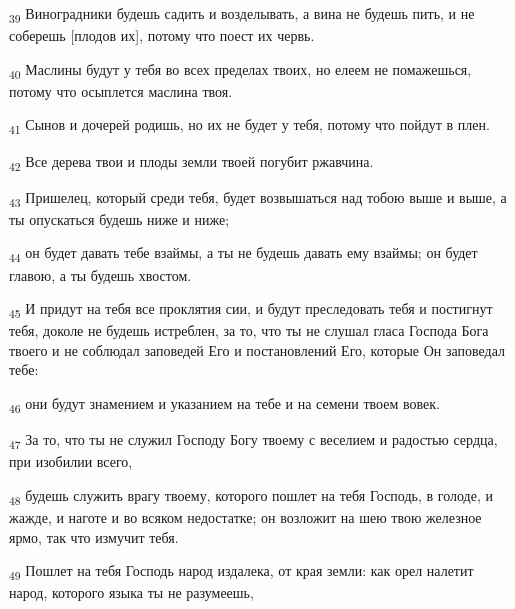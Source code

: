 \begin{tcolorbox}
\textsubscript{39} Виноградники будешь садить и возделывать, а вина не будешь пить, и не соберешь [плодов их], потому что поест их червь.
\end{tcolorbox}
\begin{tcolorbox}
\textsubscript{40} Маслины будут у тебя во всех пределах твоих, но елеем не помажешься, потому что осыплется маслина твоя.
\end{tcolorbox}
\begin{tcolorbox}
\textsubscript{41} Сынов и дочерей родишь, но их не будет у тебя, потому что пойдут в плен.
\end{tcolorbox}
\begin{tcolorbox}
\textsubscript{42} Все дерева твои и плоды земли твоей погубит ржавчина.
\end{tcolorbox}
\begin{tcolorbox}
\textsubscript{43} Пришелец, который среди тебя, будет возвышаться над тобою выше и выше, а ты опускаться будешь ниже и ниже;
\end{tcolorbox}
\begin{tcolorbox}
\textsubscript{44} он будет давать тебе взаймы, а ты не будешь давать ему взаймы; он будет главою, а ты будешь хвостом.
\end{tcolorbox}
\begin{tcolorbox}
\textsubscript{45} И придут на тебя все проклятия сии, и будут преследовать тебя и постигнут тебя, доколе не будешь истреблен, за то, что ты не слушал гласа Господа Бога твоего и не соблюдал заповедей Его и постановлений Его, которые Он заповедал тебе:
\end{tcolorbox}
\begin{tcolorbox}
\textsubscript{46} они будут знамением и указанием на тебе и на семени твоем вовек.
\end{tcolorbox}
\begin{tcolorbox}
\textsubscript{47} За то, что ты не служил Господу Богу твоему с веселием и радостью сердца, при изобилии всего,
\end{tcolorbox}
\begin{tcolorbox}
\textsubscript{48} будешь служить врагу твоему, которого пошлет на тебя Господь, в голоде, и жажде, и наготе и во всяком недостатке; он возложит на шею твою железное ярмо, так что измучит тебя.
\end{tcolorbox}
\begin{tcolorbox}
\textsubscript{49} Пошлет на тебя Господь народ издалека, от края земли: как орел налетит народ, которого языка ты не разумеешь,
\end{tcolorbox}
